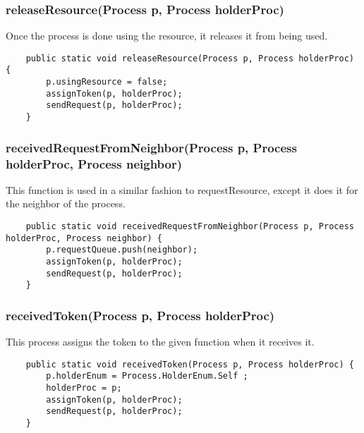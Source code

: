 \documentclass{article}
\begin{document}
		\subsubsection{releaseResource(Process p, Process holderProc) }
		Once the process is done using the resource, it releases it from being used.
		\begin{lstlisting}
	public static void releaseResource(Process p, Process holderProc) {
		p.usingResource = false;
		assignToken(p, holderProc);
		sendRequest(p, holderProc);
	}
		\end{lstlisting}
		
		\subsubsection{receivedRequestFromNeighbor(Process p, Process holderProc, Process neighbor)}
		This function is used in a similar fashion to requestResource, except it does it for the neighbor of the process.
		\begin{lstlisting}
	public static void receivedRequestFromNeighbor(Process p, Process holderProc, Process neighbor) {
		p.requestQueue.push(neighbor);
		assignToken(p, holderProc);
		sendRequest(p, holderProc);
	}
		\end{lstlisting}
		\subsubsection{receivedToken(Process p, Process holderProc) }
		This process assigns the token to the given function when it receives it.
		\begin{lstlisting}
	public static void receivedToken(Process p, Process holderProc) {
		p.holderEnum = Process.HolderEnum.Self ;
		holderProc = p;
		assignToken(p, holderProc);
		sendRequest(p, holderProc);	
	}
		\end{lstlisting}
\end{document}
